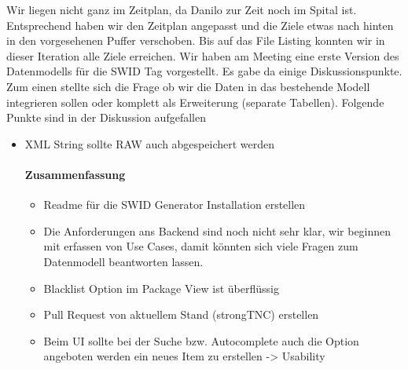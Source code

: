 Wir liegen nicht ganz im Zeitplan, da Danilo zur Zeit noch im Spital ist. Entsprechend haben wir den Zeitplan angepasst und die Ziele etwas nach hinten in den vorgesehenen Puffer verschoben. Bis auf das File Listing konnten wir in dieser Iteration alle Ziele erreichen. Wir haben am Meeting eine erste Version des Datenmodells für die SWID Tag vorgestellt. Es gabe da einige Diskussionspunkte. Zum einen stellte sich die Frage ob wir die Daten in das bestehende Modell integrieren sollen oder komplett als Erweiterung (separate Tabellen). Folgende Punkte sind in der Diskussion aufgefallen
\begin{itemize}
\item XML String sollte RAW auch abgespeichert werden

\paragraph{Zusammenfassung}
\begin{itemize}
\item Readme für die SWID Generator Installation erstellen
\item Die Anforderungen ans Backend sind noch nicht sehr klar, wir beginnen mit erfassen von Use Cases, damit könnten sich viele Fragen zum Datenmodell beantworten lassen.
\item Blacklist Option im Package View ist überflüssig
\item Pull Request von aktuellem Stand (strongTNC) erstellen
\item Beim UI sollte bei der Suche bzw. Autocomplete auch die Option angeboten werden ein neues Item zu erstellen -> Usability
\end{itemize}
\end{itemize}

